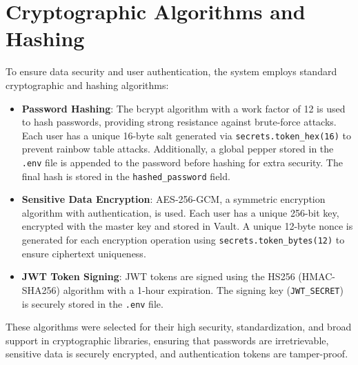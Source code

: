 \documentclass[a4paper,12pt]{article}
\begin{document}
\section{Cryptographic Algorithms and Hashing}
To ensure data security and user authentication, the system employs standard cryptographic and hashing algorithms:
\begin{itemize}
    \item \textbf{Password Hashing}: The bcrypt algorithm with a work factor of 12 is used to hash passwords, providing strong resistance against brute-force attacks. Each user has a unique 16-byte salt generated via \texttt{secrets.token\_hex(16)} to prevent rainbow table attacks. Additionally, a global pepper stored in the \texttt{.env} file is appended to the password before hashing for extra security. The final hash is stored in the \texttt{hashed\_password} field.
    \item \textbf{Sensitive Data Encryption}: AES-256-GCM, a symmetric encryption algorithm with authentication, is used. Each user has a unique 256-bit key, encrypted with the master key and stored in Vault. A unique 12-byte nonce is generated for each encryption operation using \texttt{secrets.token\_bytes(12)} to ensure ciphertext uniqueness.
    \item \textbf{JWT Token Signing}: JWT tokens are signed using the HS256 (HMAC-SHA256) algorithm with a 1-hour expiration. The signing key (\texttt{JWT\_SECRET}) is securely stored in the \texttt{.env} file.
\end{itemize}
These algorithms were selected for their high security, standardization, and broad support in cryptographic libraries, ensuring that passwords are irretrievable, sensitive data is securely encrypted, and authentication tokens are tamper-proof.

\end{document}
